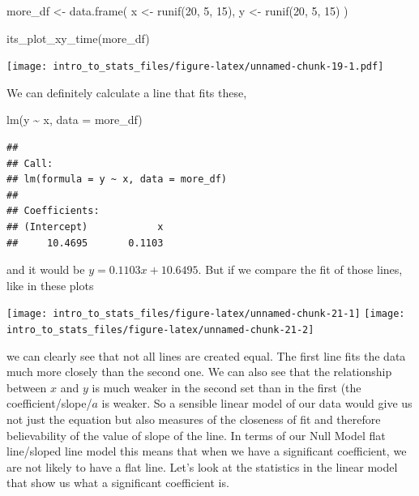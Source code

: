 \documentclass[
]{book}
\newenvironment{Shaded}{\begin{snugshade}}{\end{snugshade}}
\newcommand{\AttributeTok}[1]{\textcolor[rgb]{0.77,0.63,0.00}{#1}}
\newcommand{\DecValTok}[1]{\textcolor[rgb]{0.00,0.00,0.81}{#1}}
\newcommand{\FunctionTok}[1]{\textcolor[rgb]{0.00,0.00,0.00}{#1}}
\newcommand{\NormalTok}[1]{#1}
\newcommand{\OtherTok}[1]{\textcolor[rgb]{0.56,0.35,0.01}{#1}}
\newcommand{\SpecialCharTok}[1]{\textcolor[rgb]{0.00,0.00,0.00}{#1}}
\begin{document}
\begin{Shaded}
\begin{Highlighting}[]
\NormalTok{more\_df }\OtherTok{\textless{}{-}} \FunctionTok{data.frame}\NormalTok{(}
\NormalTok{  x }\OtherTok{\textless{}{-}} \FunctionTok{runif}\NormalTok{(}\DecValTok{20}\NormalTok{, }\DecValTok{5}\NormalTok{, }\DecValTok{15}\NormalTok{),}
\NormalTok{  y }\OtherTok{\textless{}{-}} \FunctionTok{runif}\NormalTok{(}\DecValTok{20}\NormalTok{, }\DecValTok{5}\NormalTok{, }\DecValTok{15}\NormalTok{)}
\NormalTok{)}

\FunctionTok{its\_plot\_xy\_time}\NormalTok{(more\_df)}
\end{Highlighting}
\end{Shaded}

\texttt{[image: intro\_to\_stats\_files/figure-latex/unnamed-chunk-19-1.pdf]}

We can definitely calculate a line that fits these,

\begin{Shaded}
\begin{Highlighting}[]
\FunctionTok{lm}\NormalTok{(y }\SpecialCharTok{\textasciitilde{}}\NormalTok{ x, }\AttributeTok{data =}\NormalTok{ more\_df)}
\end{Highlighting}
\end{Shaded}

\begin{verbatim}
## 
## Call:
## lm(formula = y ~ x, data = more_df)
## 
## Coefficients:
## (Intercept)            x  
##     10.4695       0.1103
\end{verbatim}

and it would be \(y = 0.1103x + 10.6495\). But if we compare the fit of those lines, like in these plots

\texttt{[image: intro\_to\_stats\_files/figure-latex/unnamed-chunk-21-1]} \texttt{[image: intro\_to\_stats\_files/figure-latex/unnamed-chunk-21-2]}

we can clearly see that not all lines are created equal. The first line fits the data much more closely than the second one. We can also see that the relationship between \(x\) and \(y\) is much weaker in the second set than in the first (the coefficient/slope/\(a\) is weaker. So a sensible linear model of our data would give us not just the equation but also measures of the closeness of fit and therefore believability of the value of slope of the line. In terms of our Null Model flat line/sloped line model this means that when we have a significant coefficient, we are not likely to have a flat line. Let's look at the statistics in the linear model that show us what a significant coefficient is.
\end{document}
